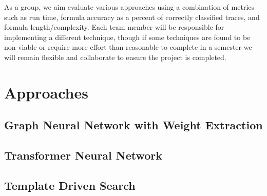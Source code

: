 \documentclass[12pt]{article}
\begin{document}
As a group, we aim evaluate various approaches using a combination of metrics such as run time, formula accuracy as a percent of correctly classified traces, and formula length/complexity.  
Each team member will be responsible for implementing a different technique, though if some techniques are found to be non-viable or require more effort than reasonable to complete in a semester we will remain flexible and collaborate to ensure the project is completed.

\section{Approaches}

\subsection{Graph Neural Network with Weight Extraction}
  

\subsection{Transformer Neural Network}
	

\subsection{Template Driven Search}
	
\end{document}
